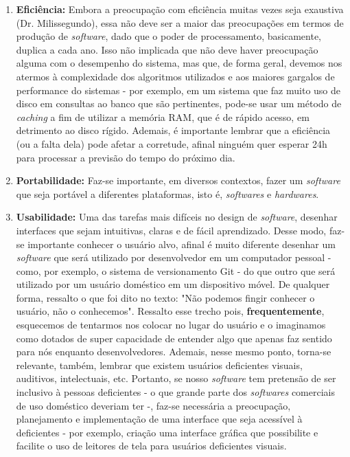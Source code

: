 \documentclass[12pt, a4paper]{article}
\begin{document}
\begin{enumerate}
            \item \textbf{Eficiência:} Embora a preocupação com eficiência muitas vezes seja exaustiva (Dr. Milissegundo), essa não deve ser a maior das preocupações em termos de produção de \textit{software}, dado que o poder de processamento, basicamente, duplica a cada ano. Isso não implicada que não deve haver preocupação alguma com o desempenho do sistema, mas que, de forma geral, devemos nos atermos à complexidade dos algoritmos utilizados e aos maiores gargalos de performance do sistemas - por exemplo, em um sistema que faz muito uso de disco em consultas ao banco que são pertinentes, pode-se usar um método de \textit{caching} a fim de utilizar a memória RAM, que é de rápido acesso, em detrimento ao disco rígido. Ademais, é importante lembrar que a eficiência (ou a falta dela) pode afetar a corretude, afinal ninguém quer esperar 24h para processar a previsão do tempo do próximo dia.
            
            \item \textbf{Portabilidade:} Faz-se importante, em diversos contextos, fazer um \textit{software} que seja portável a diferentes plataformas, isto é, \textit{softwares} e \textit{hardwares}.
            
            \item \textbf{Usabilidade:} Uma das tarefas mais difíceis no design de \textit{software}, desenhar interfaces que sejam intuitivas, claras e de fácil aprendizado. Desse modo, faz-se importante conhecer o usuário alvo, afinal é muito diferente desenhar um \textit{software} que será utilizado por desenvolvedor em um computador pessoal - como, por exemplo, o sistema de versionamento Git - do que outro que será utilizado por um usuário doméstico em um dispositivo móvel. De qualquer forma, ressalto o que foi dito no texto: "Não podemos fingir conhecer o usuário, não o conhecemos". Ressalto esse trecho pois, \textbf{frequentemente}, esquecemos de tentarmos nos colocar no lugar do usuário e o imaginamos como dotados de super capacidade de entender algo que apenas faz sentido para nós enquanto desenvolvedores. Ademais, nesse mesmo ponto, torna-se relevante, também, lembrar que existem usuários deficientes visuais, auditivos, intelectuais, etc. Portanto, se nosso \textit{software} tem pretensão de ser inclusivo 
           à pessoas deficientes - o que grande parte dos \textit{softwares} comerciais de uso doméstico deveriam ter -, faz-se necessária a preocupação, planejamento e implementação de uma interface que seja acessível 
           à deficientes - por exemplo, criação uma interface gráfica que possibilite e facilite o uso de leitores de tela para usuários deficientes visuais. 
            

\end{enumerate}
\end{document}

